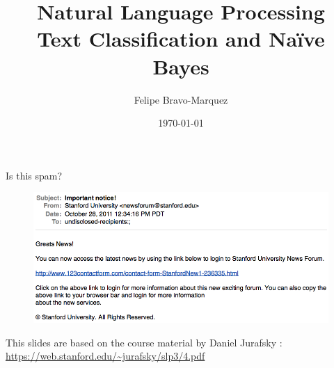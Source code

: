\documentclass[handout]{beamer}
\title{Natural Language Processing \\ Text Classification and Naïve Bayes}
\author[Felipe Bravo Márquez]{\footnotesize
 \textcolor[rgb]{0.00,0.00,1.00}{Felipe Bravo-Marquez}}
\date{\today}
\begin{document}
\begin{frame}
\titlepage


\end{frame}



\begin{frame}{Is this spam?}

\begin{figure}[h]
\includegraphics[scale = 0.35]{pics/spam.png}
\end{figure}


\begin{scriptsize}
This slides are based on the course material by Daniel Jurafsky : \url{https://web.stanford.edu/~jurafsky/slp3/4.pdf} 
\end{scriptsize}
\end{frame}
\end{document}
